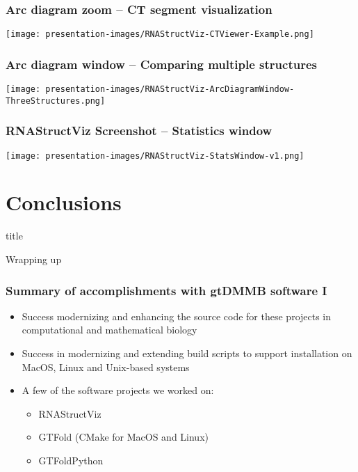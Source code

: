 \documentclass[usenames,svgnames,dvipsnames,11pt]{beamer}
\newcommand{\TitleBoxed}[1]{
     \begin{beamercolorbox}[sep=8pt,center,shadow=true,rounded=true]{title}
          \usebeamerfont{title}#1\par%
     \end{beamercolorbox}
}
\begin{document}
\begin{frame}[fragile]
\frametitle{Arc diagram zoom -- CT segment visualization}

\begin{center}
\texttt{[image: presentation-images/RNAStructViz-CTViewer-Example.png]}
\end{center}

\end{frame}

\begin{frame}[fragile]
\frametitle{Arc diagram window -- Comparing multiple structures}

\begin{center}
\texttt{[image: presentation-images/RNAStructViz-ArcDiagramWindow-ThreeStructures.png]}
\end{center}

\end{frame}

\begin{frame}[fragile]
\frametitle{RNAStructViz Screenshot -- Statistics window}

\begin{center}
\texttt{[image: presentation-images/RNAStructViz-StatsWindow-v1.png]}
\end{center}

\end{frame}

\section{Conclusions}

\begin{frame}
\TitleBoxed{
     \Huge{\centerline{Wrapping up}}
}
\end{frame}

\begin{frame}
\frametitle{Summary of accomplishments with gtDMMB software I}
\begin{itemize} 

\item Success modernizing and enhancing the source code for 
      these projects in computational and mathematical biology 
\item Success in modernizing and extending build scripts to support installation on MacOS, 
      Linux and Unix-based systems 
\item A few of the software projects we worked on:
	\begin{itemize}
	\item RNAStructViz 
	\item GTFold (CMake for MacOS and Linux)
	\item GTFoldPython
	\end{itemize}

\end{itemize}

\end{frame}
\end{document}
